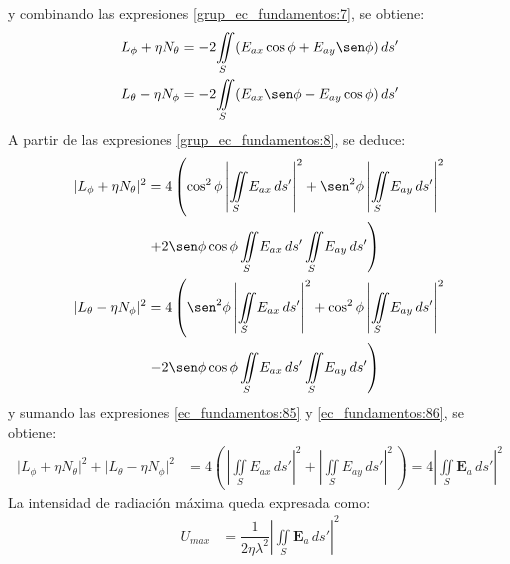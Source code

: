 y combinando las expresiones \eqref{grup_ec_fundamentos:7}, se obtiene:
\begin{subequations}
\label{grup_ec_fundamentos:8}
\begin{align}
L_{\phi} + \eta N_{\theta} &= -2\!\iint\limits_S\!\left(E_{ax}\cos\phi + E_{ay}\sen\phi\right)ds'
\label{ec_fundamentos:83}\\
L_{\theta} - \eta N_{\phi} &= -2\!\iint\limits_S\!\left(E_{ax}\sen\phi - E_{ay}\cos\phi\right)ds'
\label{ec_fundamentos:84}
\end{align}
\end{subequations}
A partir de las expresiones \eqref{grup_ec_fundamentos:8}, se deduce:
\begin{subequations}
\label{grup_ec_fundamentos:9}
\begin{align}
\begin{split}
\lvert L_{\phi} + \eta N_{\theta}\rvert^2 &= 4\left(\cos^2\phi\left|\iint\limits_S\! E_{ax}\, ds'\right|^2 + \sen^2\phi\left|\iint\limits_S\! E_{ay}\, ds'\right|^2\right.\\
&\left.+ 2\sen\phi\cos\phi\iint\limits_S\! E_{ax}\, ds'\iint\limits_S\! E_{ay}\, ds'\right)
\end{split}
\label{ec_fundamentos:85}\\
\begin{split}
\lvert L_{\theta} - \eta N_{\phi}\rvert^2 &= 4\left(\sen^2\phi\left|\iint\limits_S\! E_{ax}\, ds'\right|^2 + \cos^2\phi\left|\iint\limits_S\! E_{ay}\, ds'\right|^2\right.\\
&\left.- 2\sen\phi\cos\phi\iint\limits_S\! E_{ax}\, ds'\iint\limits_S\! E_{ay}\, ds'\right)
\end{split}
\label{ec_fundamentos:86}
\end{align}
\end{subequations}
y sumando las expresiones \eqref{ec_fundamentos:85} y \eqref{ec_fundamentos:86}, se obtiene:
\begin{align}
\lvert L_{\phi} + \eta N_{\theta}\rvert^2 + \lvert L_{\theta} - \eta N_{\phi}\rvert^2 &= 4\left(\,\left|\iint\limits_S\! E_{ax}\, ds'\right|^2 + \left|\iint\limits_S\! E_{ay}\, ds'\right|^2\,\right) = 4\left|\iint\limits_S\mathbf{E}_a\, ds'\right|^2
\label{ec_fundamentos:87}
\end{align}
La intensidad de radiación máxima queda expresada como:
\begin{align}
U_{max} &= \dfrac{1}{2\eta\lambda^2}\left|\iint\limits_S\mathbf{E}_a\, ds'\right|^2
\label{ec_fundamentos:88}
\end{align}
